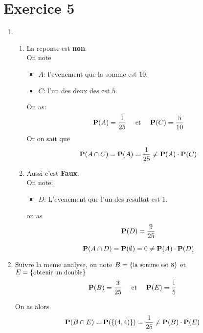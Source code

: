 \documentclass[a4paper]{tufte-handout}
\begin{document}
\section{Exercice 5}
\begin{enumerate}
  \item
\begin{enumerate}
  \item La reponse est \textbf{non}.\\
    On note 
    \begin{itemize}
      \item $A$: l'evenement que la somme est $10$.
      \item $C$: l'un des deux des est $5$.
    \end{itemize}
    On as:
    $$
    \P(A) = \frac{1}{25} \quad \text{ et }\quad \P(C) = \frac{5}{10}
    $$
    Or on sait que 
    $$
    \P(A\cap C) = \P(A) = \frac{1}{25} \neq \P(A)\cdot\P(C)
    $$
  \item Aussi c'est \textbf{Faux}.\\
    On note:
    \begin{itemize}
      \item $D$: L'evenement que l'un des resultat est $1$.
    \end{itemize}
    on as 
    $$
    \P(D) = \frac{9}{25}
    $$

    $$
    \P(A\cap D) = \P(\emptyset) = 0  \neq \P(A)\cdot\P(D)
    $$
\end{enumerate}
\item Suivre la meme analyse, on note $B=\{\text{\small la somme est 8}\}$ et
  $E=\{\text{\small obtenir un double}\}$
  $$
  \P(B) = \frac{3}{25} \quad \text{ et } \quad \P(E) = \frac{1}{5}
  $$

  On as alors
  $$
  \P(B\cap E) = \P(\{(4,4)\}) = \frac{1}{25}\neq \P(B)\cdot \P(E)
  $$
\end{enumerate}
\end{document}
